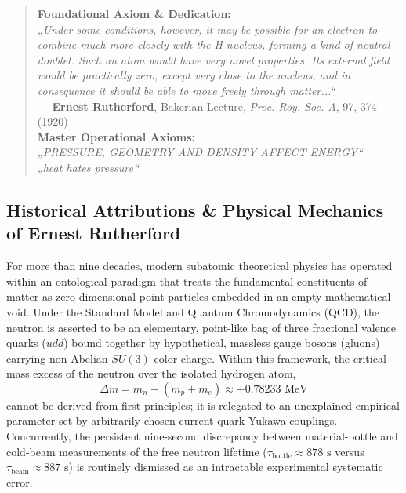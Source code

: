 \documentclass[11pt,a4paper]{article}
\begin{document}
\begin{quote}
\centering
\textbf{Foundational Axiom \& Dedication:}\\
\textit{„Under some conditions, however, it may be possible for an electron to combine much more closely with the H-nucleus, forming a kind of neutral doublet. Such an atom would have very novel properties. Its external field would be practically zero, except very close to the nucleus, and in consequence it should be able to move freely through matter...“}\\
\hfill --- \textbf{Ernest Rutherford}, Bakerian Lecture, \textit{Proc. Roy. Soc. A}, 97, 374 (1920)~\cite{Rutherford1920}\\[6pt]
\textbf{Master Operational Axioms:}\\
\textit{„PRESSURE, GEOMETRY AND DENSITY AFFECT ENERGY“}\\
\textit{„heat hates pressure“}
\end{quote}

\subsection{Historical Attributions \& Physical Mechanics of Ernest Rutherford}
\label{subsec:rutherford_historical}

For more than nine decades, modern subatomic theoretical physics has operated within an ontological paradigm that treats the fundamental constituents of matter as zero-dimensional point particles embedded in an empty mathematical void. Under the Standard Model and Quantum Chromodynamics (QCD), the neutron is asserted to be an elementary, point-like bag of three fractional valence quarks ($udd$) bound together by hypothetical, massless gauge bosons (gluons) carrying non-Abelian $SU(3)$ color charge. Within this framework, the critical mass excess of the neutron over the isolated hydrogen atom,
\begin{equation}
\Delta m = m_n - (m_p + m_e) \approx +0.78233\text{ MeV}
\end{equation}
cannot be derived from first principles; it is relegated to an unexplained empirical parameter set by arbitrarily chosen current-quark Yukawa couplings. Concurrently, the persistent nine-second discrepancy between material-bottle and cold-beam measurements of the free neutron lifetime ($\tau_{\text{bottle}} \approx 878\text{ s}$ versus $\tau_{\text{beam}} \approx 887\text{ s}$) is routinely dismissed as an intractable experimental systematic error.
\end{document}
